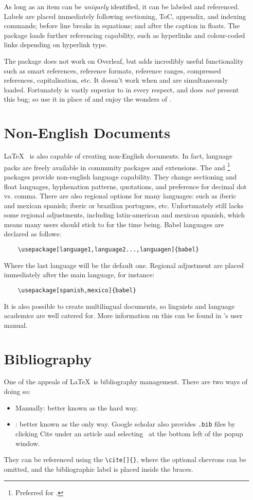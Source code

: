 As long as an item can be \emph{uniquely} identified, it can be
labeled and referenced.  Labels are placed immediately following
sectioning, ToC, appendix, and indexing commands; before line breaks
in equations; and after the caption in floats.  The 
package loads further referencing capability, such as hyperlinks and
colour-coded links depending on hyperlink type.

The package  does not work on Overleaf, but adds
incredibly useful functionality such as smart references, reference
formats, reference ranges, compressed references, capitalisation, etc.
It doesn't work when  and  are
simultaneously loaded.  Fortunately  is vastly
superior to  in every respect, and does \emph{not}
present this bug; so use it in place of  and enjoy the
wonders of .
%
\section{Non-English Documents}
%
\LaTeX~ is also capable of creating non-English documents.  In fact,
language packs are freely available in community packages and
extensions.  The  and
\footnote{Preferred for \XeLaTeX.} packages provide
non-english language capability.  They change sectioning and float
languages, hyphenation patterns, quotations, and preference for
decimal dot vs. comma.  There are also regional options for many
languages: such as iberic and mexican spanish; iberic or brazilian
portugues, etc.  Unfortunately  still lacks some
regional adjustments, including latin-american and mexican spanish,
which means many users should stick to  for the time
being.  Babel languages are declared as follows:
\begin{verbatim}
	\usepackage[language1,language2...,languagen]{babel}
\end{verbatim}
Where the last language will be the default one.  Regional adjustment
are placed immediately after the main language, for instance:
\begin{verbatim}
	\usepackage[spanish,mexico]{babel}
\end{verbatim}

It is also possible to create multilingual documents, so linguists and
language academics are well catered for.  More information on this can
be found in 's user manual.
%
\section{Bibliography}
%
One of the appeals of \LaTeX~is bibliography management.  There are
two ways of doing so:
\begin{itemize}
\item Manually: better known as the hard way.
\item \BibTeX: better known as the only way.  Google scholar also
  provides \texttt{.bib} files by clicking Cite under an article and
  selecting \BibTeX~at the bottom left of the popup window.
\end{itemize}
They can be referenced using the \verb|\cite[]{}|, where the optional
chevrons can be omitted, and the bibliographic label is placed inside
the braces.
%
